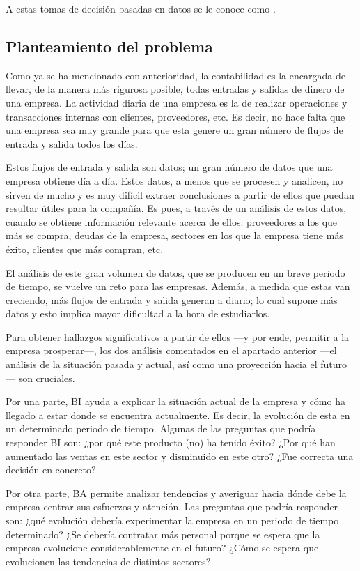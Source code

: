A estas tomas de decisión basadas en datos se le  conoce como .


\subsection{Planteamiento del problema}
Como ya se ha mencionado con anterioridad, la contabilidad es la encargada de llevar, de la manera más rigurosa posible, todas entradas y salidas de dinero de una empresa. La actividad diaria de una empresa es la de realizar operaciones y transacciones internas con clientes, proveedores, etc. Es decir, no hace falta que una empresa sea muy grande para que esta genere un gran número de flujos de entrada y salida todos los días.  

Estos flujos de entrada y salida son datos; un gran número de datos que una empresa obtiene día a día. Estos datos, a menos que se procesen y analicen, no sirven de mucho y es muy difícil extraer conclusiones a partir de ellos que puedan resultar útiles para la compañía. Es pues, a través de un análisis de estos datos, cuando se obtiene información relevante acerca de ellos: proveedores a los que más se compra, deudas de la empresa, sectores en los que la empresa tiene más éxito, clientes que más compran, etc.

El análisis de este gran volumen de datos, que se producen en un breve periodo de tiempo, se vuelve un reto para las empresas. Además, a medida que estas van creciendo, más flujos de entrada y salida generan a diario; lo cual supone más datos y esto implica mayor dificultad a la hora de estudiarlos. 

Para obtener hallazgos significativos a partir de ellos ---y por ende, permitir a la empresa prosperar---, los dos análisis comentados en el apartado anterior ---el análisis de la situación pasada y actual, así como una proyección hacia el futuro--- son cruciales.

Por una parte, BI ayuda a explicar la situación actual de la empresa y cómo ha llegado a estar donde se encuentra actualmente. Es decir, la evolución de esta en un determinado periodo de tiempo. Algunas de las preguntas que podría responder BI son: ¿por qué este producto (no) ha tenido éxito?  ¿Por qué han aumentado las ventas en este sector y disminuido en este otro? ¿Fue correcta una decisión en concreto?

Por otra parte, BA permite analizar tendencias y averiguar hacia dónde debe la empresa centrar sus esfuerzos y atención. Las preguntas que podría responder son: ¿qué evolución debería experimentar la empresa en un periodo de tiempo determinado? ¿Se debería contratar más personal porque se espera que la empresa evolucione considerablemente en el futuro? ¿Cómo se espera que evolucionen las tendencias de distintos sectores?

